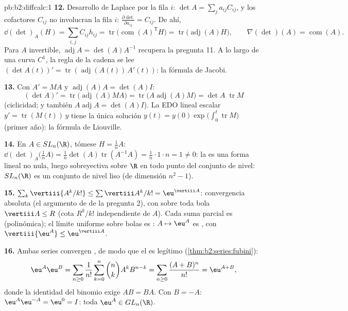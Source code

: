 \begin{solution}{pb:b2:diffcalc:1}
\textbf{12.} Desarrollo de Laplace por la fila $i$: $\det A = \sum_j
a_{ij}C_{ij}$, y los cofactores $C_{ij}$ no involucran la fila $i$:
$\frac{\partial\det}{\partial a_{ij}} = C_{ij}$. De ahí,
\[
\dd(\det)_A(H) = \sum_{i,j}C_{ij}h_{ij}
= \operatorname{tr}\bigl(\operatorname{com}(A)^{\mathsf T}
H\bigr)
= \operatorname{tr}\bigl(\operatorname{adj}(A)H\bigr),
\qquad
\nabla(\det)(A) = \operatorname{com}(A) .
\]
Para $A$ invertible, $\operatorname{adj}A = \det(A)A^{-1}$ recupera
la pregunta 11. A lo largo de una curva $C^1$, la regla de la cadena
se lee $(\det A(t))' =
\operatorname{tr}(\operatorname{adj}(A(t))\,A'(t))$: la fórmula de
Jacobi.

\textbf{13.} Con $A' = MA$ y $\operatorname{adj}(A)A = \det(A)I$:
\[
(\det A)' = \operatorname{tr}\bigl(\operatorname{adj}(A)MA
\bigr)
= \operatorname{tr}\bigl(A\operatorname{adj}(A)M\bigr)
= \det A\;\operatorname{tr}M
\]
(ciclicidad; y también $A\operatorname{adj}A = \det(A) I$). La EDO
lineal escalar $y' = \operatorname{tr}(M(t))\,y$ tiene la única
solución $y(t) = y(0)\exp\bigl(\int_0^t \operatorname{tr}M\bigr)$
(primer año): la fórmula de Liouville.

\textbf{14.} En $A \in SL_n(\R)$, tómese $H = \frac1nA$:
$\dd(\det)_A\bigl(\tfrac1nA\bigr) = \frac1n\det(A)
\operatorname{tr}(A^{-1}A) = \frac1n\cdot1\cdot n = 1 \neq 0$: la
 es una forma lineal no nula, luego sobreyectiva sobre
$\R$ en todo punto del conjunto de nivel: $SL_n(\R)$ es un conjunto
de nivel liso (de dimensión $n^2 - 1$).

\textbf{15.} $\sum_k\vertiii{A^k/k!} \leq \sum\vertiii A^k/k! =
\eu^{\vertiii A}$: convergencia absoluta (el argumento de
 de la pregunta 2), con  sobre toda
bola $\vertiii A \leq R$ (cota $R^k/k!$ independiente de $A$). Cada
suma parcial es  (polinómica); el límite uniforme sobre bolas
es : $A \mapsto \eu^A$ es , con $\vertiii{\eu^A} \leq
\eu^{\vertiii A}$.

\textbf{16.} Ambas series convergen , de modo que el
 es legítimo (\cref{thm:b2:series:fubini}):
\[
\eu^A\eu^B = \sum_{n\geq0}\frac{1}{n!}\sum_{k=0}^n\binom
nkA^kB^{n-k}
= \sum_{n\geq0}\frac{(A+B)^n}{n!} = \eu^{A+B},
\]
donde la identidad del binomio exige $AB = BA$. Con $B = -A$:
$\eu^A\eu^{-A} = \eu^0 = I$: toda $\eu^A \in GL_n(\R)$.


\end{solution}
